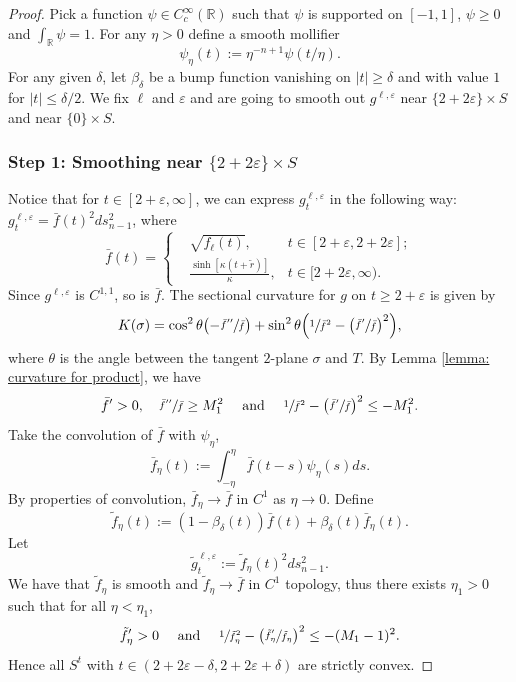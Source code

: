 \documentclass[JEP,XML,SOM,Unicode,NoFloatCountersInSection]{cedram}
\theoremstyle{definition}
\let\eps\varepsilon
\renewcommand{\>}{{\rangle}}
\newcommand{\<}{{\langle}}
\begin{document}
\begin{proof}
Pick a function $\psi\in C^{\infty}_c(\mathbb{R})$ such that $\psi$ is supported on $[-1,1]$, $\psi\geq 0$ and $\int_{\mathbb{R}}\psi=1$. For any $\eta>0$ define a smooth mollifier
\[
\psi_\eta(t):=\eta^{-n+1}\psi(t/\eta).
\]
For any given $\delta$, let $\beta_\delta$ be a bump function vanishing on $|t|\geq \delta$ and with value $1$ for $|t|\leq \delta/2$. We fix $\ell$ and $\eps$ and are going to smooth out $g^{\ell,\eps}$ near $\{2+2\eps\}\times S$ and near $\{0\}\times S$.

\subsubsection*{Step 1: Smoothing near $\{2+2\eps\}\times S$}
Notice that for $t\in [2+\eps, \infty]$, we can express $g^{\ell,\eps}_t$ in the following way: $g^{\ell,\eps}_t=\bar{f}(t)^2ds^2_{n-1}$, where
\begin{equation*}
\bar{f}(t)=\left\{\begin{aligned}
&\sqrt{f_\ell(t)}, &t\in [2+\eps, 2+2\eps];\\
&\frac{\sinh [\kappa(t+\tilde{r})]}{\kappa}, &t\in [2+2\eps,\infty).
\end{aligned}
\right.
\end{equation*}
Since $g^{\ell,\eps}$ is $C^{1,1}$, so is $\bar{f}$. The sectional curvature for $g$ on $t\geq 2+\eps$ is given by
\[
K(\sigma)=\cos^2\theta\bigl(-\sfrac{\bar{f}''}{\bar{f}}\bigr)+\sin^2\theta\Bigl(\sfrac{1}{\bar{f}^2}-\bigl(\sfrac{\bar{f}'}{\bar{f}}\bigr)^2\Bigr),
\]
where $\theta$ is the angle between the tangent $2$-plane $\sigma$ and $T$.
By Lemma \ref{lemma: curvature for product}, we have
\[
\bar{f}'>0, \quad \sfrac{\bar{f}''}{\bar{f}}\geq M_1^2\quad \text{ and } \quad \sfrac{1}{\bar{f}^2}-\bigl(\sfrac{\bar{f}'}{\bar{f}} \bigr)^2\leq -M_1^2.
\]
Take the convolution of $\bar{f}$ with $\psi_{\eta}$,
\[
\bar{f}_{\eta}(t):=\int_{-\eta}^{\eta}\bar{f}(t-s)\psi_{\eta}(s)ds.
\]
By properties of convolution, $\bar{f}_{\eta}\to\bar{f}$ in $C^1$ as $\eta\to 0$. Define
\[
\tilde{f}_{\eta}(t):=(1-\beta_\delta(t))\bar{f}(t)+\beta_\delta(t)\bar{f}_{\eta}(t).
\]
Let
\[
\tilde{g}^{\ell,\eps}_t:=\tilde{f}_{\eta}(t)^2ds^2_{n-1}.
\]
We have that $\tilde{f}_{\eta}$ is smooth and $\tilde{f}_{\eta}\to\bar{f}$ in $C^1$ topology, thus there exists $\eta_1>0$ such that for all $\eta<\eta_1$,
\[
\tilde{f}'_{\eta}>0\quad \text{ and } \quad \sfrac{1}{\tilde{f}_{\eta}^2}-\bigl(\sfrac{\tilde{f}'_{\eta}}{\tilde{f}_{\eta}} \bigr)^2\leq -(M_1-1)^2.
\]
Hence all $S^t$ with $t\in (2+2\eps-\delta,2+2\eps+\delta)$ are strictly convex.


\end{proof}
\end{document}
